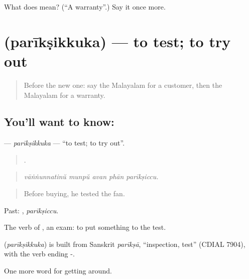 \begin{tcolorbox}[breakable,colback=teal!4,colframe=teal!35!black,title={Before you move on}]
What does  mean? (\textquotedblleft{}A warranty\textquotedblright{}.) Say it once more.
\end{tcolorbox}
\section[\texorpdfstring{\ml{പരീക്ഷിക്കുക} (parīkṣikkuka)}{പരീക്ഷിക്കുക (parīkṣikkuka)}]{ (parīkṣikkuka) — to test; to try out}

\label{lesson:ML-C493-pariksikkuka}



\begin{quote}
Before the new one: say the Malayalam for a customer, then the Malayalam for a warranty.
\end{quote}

\subsection*{You'll want to know: }
\textbf{} — \emph{parīkṣikkuka} — \textquotedblleft{}to test; to try out\textquotedblright{}.

\begin{quote}
    .
\end{quote}

\begin{quote}
\emph{vāṅṅunnatinŭ munpŭ avan phān parīkṣiccu.}
\end{quote}

\begin{quote}
Before buying, he tested the fan.
\end{quote}

Past: , \emph{parīkṣiccu}.

The verb of , an exam: to put something to the test.

\begin{cousinweb}
\textbf{} (\emph{parīkṣikkuka}) is built from Sanskrit \emph{parīkṣā}, \textquotedblleft{}inspection, test\textquotedblright{} (CDIAL 7904), with the verb ending -.
\end{cousinweb}

\begin{grammarlens}[title={What you've built}]
One more word for getting around.
\end{grammarlens}

